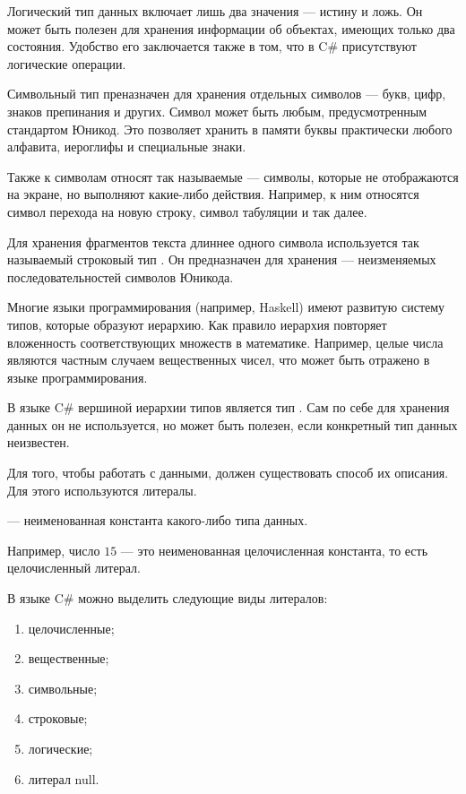 
Логический тип данных  включает лишь два значения — истину и
ложь. Он может быть полезен для хранения информации об объектах,
имеющих только два состояния. Удобство его заключается также в том,
что в C\# присутствуют логические операции.


Символьный тип  преназначен для хранения отдельных символов —
букв, цифр, знаков препинания и других. Символ может быть любым,
предусмотренным стандартом Юникод. Это позволяет хранить в памяти
буквы практически любого алфавита, иероглифы и специальные знаки.

Также к символам относят так называемые  — символы,
которые не отображаются на экране, но выполняют какие-либо
действия. Например, к ним относятся символ перехода на новую строку,
символ табуляции и так далее.


Для хранения фрагментов текста длиннее одного символа используется так
называемый строковый тип . Он предназначен для хранения
 — неизменяемых последовательностей символов
Юникода.


Многие языки программирования (например, Haskell) имеют развитую
систему типов, которые образуют иерархию. Как правило иерархия
повторяет вложенность соответствующих множеств в математике. Например,
целые числа являются частным случаем вещественных чисел, что может
быть отражено в языке программирования.

В языке C\# вершиной иерархии типов является тип .  Сам
по себе для хранения данных он не используется, но может быть полезен,
если конкретный тип данных неизвестен.


Для того, чтобы работать с данными, должен существовать способ их
описания. Для этого используются литералы.

\begin{defn}
   — неименованная константа какого-либо типа
  данных.
\end{defn}

Например, число $15$ — это неименованная целочисленная константа, то
есть целочисленный литерал.

В языке C\# можно выделить следующие виды литералов:
\begin{enumerate}
\item целочисленные;
\item вещественные;
\item символьные;
\item строковые;
\item логические;
\item литерал null.
\end{enumerate}

